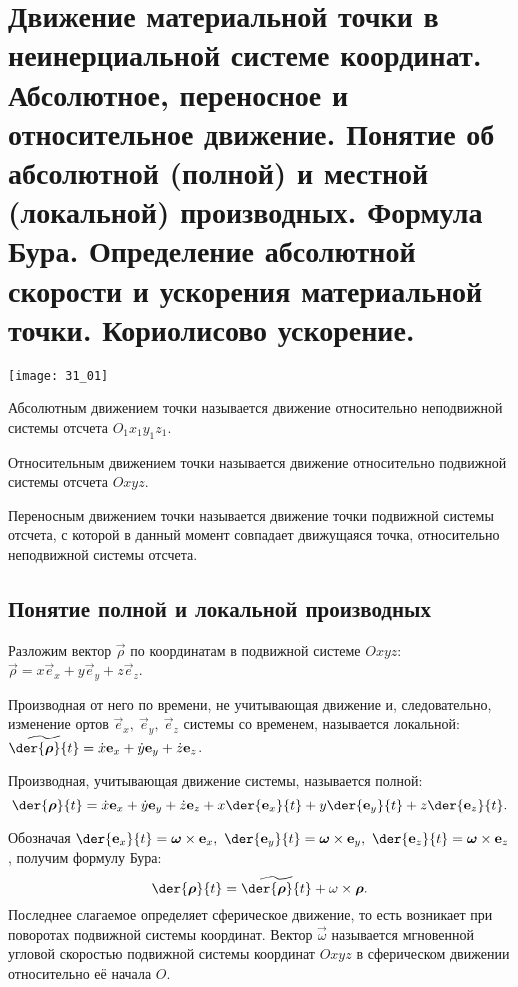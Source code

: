 \chapter{Движение материальной точки в неинерциальной системе координат.
Абсолютное, переносное и относительное движение. Понятие об абсолютной
(полной) и местной (локальной) производных. Формула Бура. Определение
абсолютной скорости и ускорения материальной точки. Кориолисово ускорение.}

\begin{minipage}{.4\textwidth}
    \texttt{[image: 31\_01]}
\end{minipage}\hfill
\begin{minipage}{.55\textwidth}
    Абсолютным движением точки называется движение относительно неподвижной
    системы отсчета \( O_1x_1y_1z_1 \).
    
    Относительным движением точки называется движение относительно подвижной
    системы отсчета \( Oxyz \).
    
    Переносным движением точки называется движение точки подвижной системы
    отсчета, с которой в данный момент совпадает движущаяся точка, относительно
    неподвижной системы отсчета.
\end{minipage}

\section{Понятие полной и локальной производных}
Разложим вектор \( \vec{\rho} \) по координатам в подвижной системе \( Oxyz \):
\( \vec{\rho} = x\vec{e}_x + y\vec{e}_y + z\vec{e}_z \).

Производная от него по времени, не учитывающая движение и, следовательно,
изменение ортов \( \vec{e}_x,\ \vec{e}_y,\ \vec{e}_z \) системы со временем,
называется локальной:
\( \ds \widetilde{\der{\vec{\rho}}{t}} = \dot{x}\vec{e}_x + \dot{y}\vec{e}_y +
\dot{z}\vec{e}_z \).

Производная, учитывающая движение системы, называется полной:
\[
    \der{\vec{\rho}}{t} = \dot{x}\vec{e}_x + \dot{y}\vec{e}_y + \dot{z}\vec{e}_z
    + x\der{\vec{e}_x}{t} + y\der{\vec{e}_y}{t} + z\der{\vec{e}_z}{t}.
\]

Обозначая \( \ds \der{\vec{e}_x}{t} = \vec{\omega}\times\vec{e}_x,\ 
\der{\vec{e}_y}{t} = \vec{\omega}\times\vec{e}_y,\ \der{\vec{e}_z}{t} =
\vec{\omega}\times\vec{e}_z \), получим формулу Бура:
\[
    \der{\vec{\rho}}{t} = \widetilde{\der{\vec{\rho}}{t}} + \omega\times\vec{\rho}.
\]
Последнее слагаемое определяет сферическое движение, то есть возникает при
поворотах подвижной системы координат. Вектор \( \vec{\omega} \) называется
мгновенной угловой скоростью подвижной системы координат \( Oxyz \) в
сферическом движении относительно её начала \( O \).

